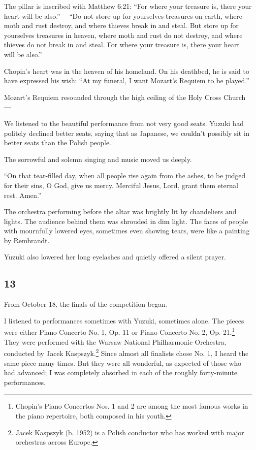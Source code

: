 \documentclass[
    a4paper,
    12pt,
    twoside,
    openany,
    UTF8,
    fontset=windows
]{ctexbook}
\begin{document}
The pillar is inscribed with Matthew 6:21: ``For where your treasure is, there your heart will be also.'' ---``Do not store up for yourselves treasures on earth, where moth and rust destroy, and where thieves break in and steal. But store up for yourselves treasures in heaven, where moth and rust do not destroy, and where thieves do not break in and steal. For where your treasure is, there your heart will be also.''

Chopin's heart was in the heaven of his homeland. On his deathbed, he is said to have expressed his wish: ``At my funeral, I want Mozart's Requiem to be played.''

Mozart's Requiem resounded through the high ceiling of the Holy Cross Church---

We listened to the beautiful performance from not very good seats. Yuzuki had politely declined better seats, saying that as Japanese, we couldn't possibly sit in better seats than the Polish people.

The sorrowful and solemn singing and music moved us deeply.

``On that tear-filled day,
when all people rise again from the ashes,
to be judged for their sins,
O God, give us mercy.
Merciful Jesus, Lord,
grant them eternal rest. Amen.''

The orchestra performing before the altar was brightly lit by chandeliers and lights. The audience behind them was shrouded in dim light. The faces of people with mournfully lowered eyes, sometimes even showing tears, were like a painting by Rembrandt.

Yuzuki also lowered her long eyelashes and quietly offered a silent prayer.


\subsection*{13}

From October 18, the finals of the competition began.

I listened to performances sometimes with Yuzuki, sometimes alone. The pieces were either Piano Concerto No. 1, Op. 11 or Piano Concerto No. 2, Op. 21.\footnote{Chopin's Piano Concertos Nos. 1 and 2 are among the most famous works in the piano repertoire, both composed in his youth.} They were performed with the Warsaw National Philharmonic Orchestra, conducted by Jacek Kaspszyk.\footnote{Jacek Kaspszyk (b. 1952) is a Polish conductor who has worked with major orchestras across Europe.} Since almost all finalists chose No. 1, I heard the same piece many times. But they were all wonderful, as expected of those who had advanced; I was completely absorbed in each of the roughly forty-minute performances.
\end{document}
